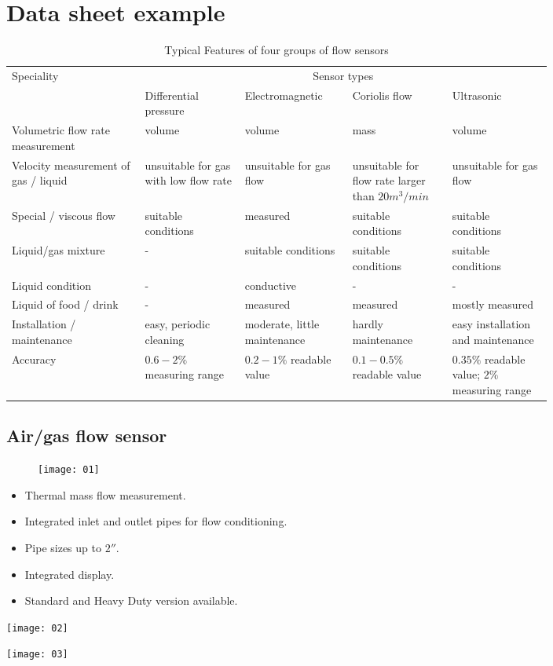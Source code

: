 \section{Data sheet example}
\begin{table}[ht]
	\centering
	\caption{Typical Features of four groups of flow sensors}
	\begin{tabular}{p{0.2\linewidth}p{0.15\linewidth}p{0.15\linewidth}p{0.15\linewidth}p{0.15\linewidth}}\toprule
		\multirow{2}{*}{Speciality} & \multicolumn{4}{c}{Sensor types} \\\cmidrule{2-5}
		& Differential pressure & Electromagnetic & Coriolis flow & Ultrasonic\\\midrule
		Volumetric flow rate measurement & volume & volume & mass & volume\\
		Velocity measurement of gas / liquid & unsuitable for gas with low flow rate & unsuitable for gas flow & unsuitable for flow rate larger than $ 20m^3/min $ & unsuitable for gas flow\\
		Special / viscous flow & suitable conditions & measured & suitable conditions &  suitable conditions\\
		Liquid/gas mixture & - & suitable conditions & suitable conditions & suitable conditions\\
		Liquid condition & - & conductive & - & -\\
		Liquid of food / drink & - & measured & measured & mostly measured\\
		Installation / maintenance & easy, periodic cleaning & moderate, little maintenance & hardly maintenance & easy installation and maintenance\\
		Accuracy & $ 0.6-2\% $ measuring range & $ 0.2-1\% $ readable value & $ 0.1-0.5\% $ readable value & $ 0.35\% $ readable value; $ 2\% $ measuring range\\\bottomrule
	\end{tabular}
\end{table}

\subsection{Air/gas flow sensor}
\begin{figure}[ht]
	\centering
	\texttt{[image: 01]}
\end{figure}
\clearpage

\begin{itemize}
	\item Thermal mass flow measurement.
	\item Integrated inlet and outlet pipes for flow conditioning.
	\item Pipe sizes up to $ 2'' $.
	\item Integrated display.
	\item Standard and Heavy Duty version available.
\end{itemize}
\begin{center}
	\texttt{[image: 02]}
\end{center}
\begin{center}
	\texttt{[image: 03]}
\end{center}

